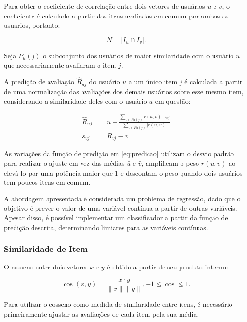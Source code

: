 Para obter o coeficiente de correlação entre dois vetores de usuários $u$ e $v$,
o coeficiente é calculado a partir dos itens avaliados em comum por ambos os
usuários, portanto:

\begin{equation}
    N = |I_u \cap I_v|.
\end{equation}

Seja $P_u (j)$ o subconjunto dos usuários de maior similaridade com o usuário
$u$ que necessariamente avaliaram o item $j$.

A predição de avaliação
$\hat{R}_{uj}$ do usuário $u$ a um único item $j$ é calculada a partir de uma
normalização das avaliações dos demais usuários sobre esse mesmo item,
considerando a similaridade deles com o usuário $u$ em questão:

\begin{align}
    \label{eq:predicao}
\hat{R}_{uj} &= \bar{u} + \frac{\sum_{v \in Pu(j)} r(u,v) \cdot s_{vj}}{\sum_{v \in Pu(j)} |r(u,v)|} \\
s_{vj} &= R_{vj} - \bar{v}
\end{align}

As variações da função de predição em \ref{eq:predicao} utilizam o desvio padrão
para realizar o ajuste em vez das médias $\bar{u}$ e $\bar{v}$, amplificam o
peso $r(u,v)$ ao elevá-lo por uma potência maior que 1 e descontam o peso quando
dois usuários tem poucos itens em comum.

A abordagem apresentada é considerada um problema de regressão, dado que o objetivo é prever
o valor de uma variável contínua a partir de outras variáveis. Apesar disso, é
possível implementar um classificador a partir da função de predição descrita,
determinando limiares para as variáveis contínuas.

\subsubsection{Similaridade de Item}

O cosseno entre dois vetores $x$ e $y$ é obtido a partir de seu produto interno:

\begin{equation}
    \cos(x,y) = \frac{x \cdot y}{\|x\| \|y\|}, -1 \leq \cos \leq 1.
\end{equation}

Para utilizar o cosseno como medida de similaridade entre itens, é necessário
primeiramente ajustar as avaliações de cada item pela sua média.

